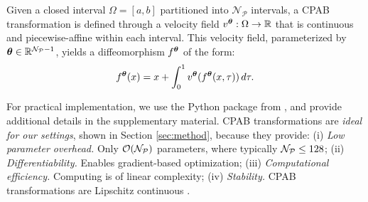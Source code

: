 \begin{definition}
    Given a closed interval $\Omega = [a, b]$ partitioned into $\mathcal{N}_{\mathcal{P}}$ intervals, a CPAB transformation is defined through a velocity field $v^{\bm{\theta}}: \Omega \to {\mathbb{R}}$ that is continuous and piecewise-affine within each interval. This velocity field, parameterized by ${\bm{\theta}} \in {\mathbb{R}}^{{\mathcal{N}}_{{\mathcal{P}}} - 1}$, yields a diffeomorphism $f^{{\bm{\theta}}}$ of the form:
\begin{equation}
\label{eq:cpab}
    f^{{\bm{\theta}}}(x) = x + \int_0^1 v^{\bm{\theta}}(f^{{\bm{\theta}}}(x, \tau))\, d\tau.
\end{equation}
\end{definition}
\noindent For practical implementation, we use the Python package from \citet{martinez2022closed}, and provide additional details in the supplementary material. 
\noindent
CPAB transformations are \emph{ideal for our settings}, shown in Section \ref{sec:method}, because they provide: (i) \textit{Low parameter overhead.} Only ${\mathcal{O}}({\mathcal{N}}_{\mathcal{P}})$ parameters, where typically \({\mathcal{N}}_{\mathcal{P}} \leq 128\); (ii) \textit{Differentiability.} Enables gradient-based optimization; (iii) \textit{Computational efficiency.} Computing  is of linear complexity; (iv) \textit{Stability.} CPAB transformations are Lipschitz continuous \cite{freifeld2017transformations}.